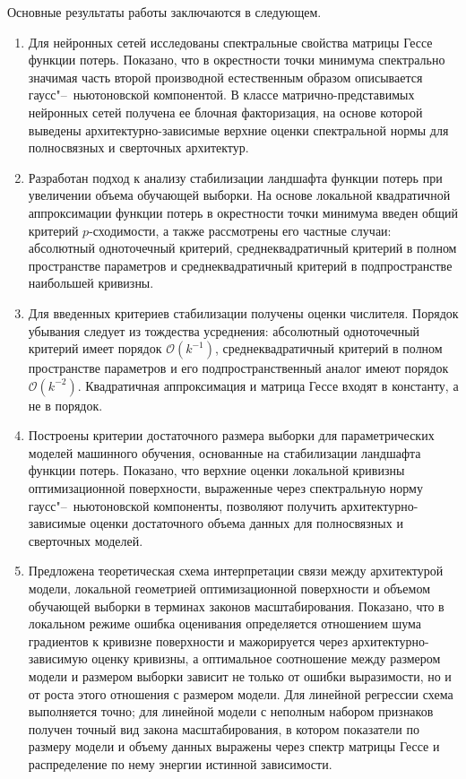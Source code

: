 Основные результаты работы заключаются в следующем.
\begin{enumerate}[beginpenalty=10000]
    \item Для нейронных сетей исследованы спектральные свойства матрицы Гессе функции потерь. Показано, что в окрестности точки минимума спектрально значимая часть второй производной естественным образом описывается гаусс"--~ньютоновской компонентой. В классе матрично-представимых нейронных сетей получена ее блочная факторизация, на основе которой выведены архитектурно-зависимые верхние оценки спектральной нормы для полносвязных и сверточных архитектур.

    \item Разработан подход к анализу стабилизации ландшафта функции потерь при увеличении объема обучающей выборки. На основе локальной квадратичной аппроксимации функции потерь в окрестности точки минимума введен общий критерий $p$-сходимости, а также рассмотрены его частные случаи: абсолютный одноточечный критерий, среднеквадратичный критерий в полном пространстве параметров и среднеквадратичный критерий в подпространстве наибольшей кривизны.

    \item Для введенных критериев стабилизации получены оценки числителя. Порядок убывания следует из тождества усреднения: абсолютный одноточечный критерий имеет порядок $\mathcal{O}(k^{-1})$, среднеквадратичный критерий в полном пространстве параметров и его подпространственный аналог имеют порядок $\mathcal{O}(k^{-2})$. Квадратичная аппроксимация и матрица Гессе входят в константу, а не в порядок.

    \item Построены критерии достаточного размера выборки для параметрических моделей машинного обучения, основанные на стабилизации ландшафта функции потерь. Показано, что верхние оценки локальной кривизны оптимизационной поверхности, выраженные через спектральную норму гаусс"--~ньютоновской компоненты, позволяют получить архитектурно-зависимые оценки достаточного объема данных для полносвязных и сверточных моделей.

    \item Предложена теоретическая схема интерпретации связи между архитектурой модели, локальной геометрией оптимизационной поверхности и объемом обучающей выборки в терминах законов масштабирования. Показано, что в локальном режиме ошибка оценивания определяется отношением шума градиентов к кривизне поверхности и мажорируется через архитектурно-зависимую оценку кривизны, а оптимальное соотношение между размером модели и размером выборки зависит не только от ошибки выразимости, но и от роста этого отношения с размером модели. Для линейной регрессии схема выполняется точно; для линейной модели с неполным набором признаков получен точный вид закона масштабирования, в котором показатели по размеру модели и объему данных выражены через спектр матрицы Гессе и распределение по нему энергии истинной зависимости.


\end{enumerate}
